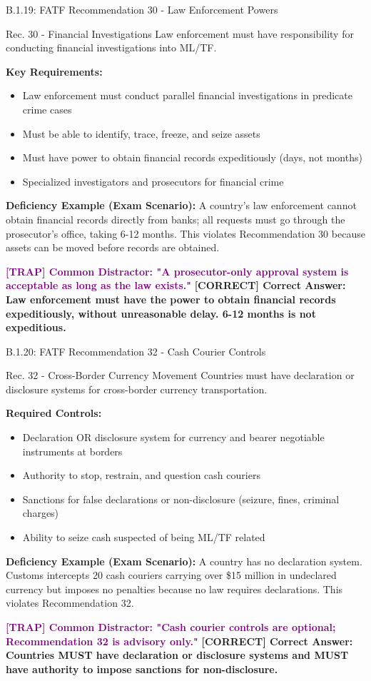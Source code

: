 \documentclass[11pt,a4paper]{beamer}
\newcommand{\trap}[1]{\textcolor{purple}{\textbf{[TRAP] #1}}}
\newcommand{\correct}[1]{\textcolor{green!50!black}{\textbf{[CORRECT] #1}}}
\begin{document}
	\begin{frame}{B.1.19: FATF Recommendation 30 - Law Enforcement Powers}
		\begin{block}{Rec. 30 - Financial Investigations}
			Law enforcement must have responsibility for conducting financial investigations into ML/TF.
		\end{block}
		\textbf{Key Requirements:}
		\begin{itemize}
			\item Law enforcement must conduct parallel financial investigations in predicate crime cases
			\item Must be able to identify, trace, freeze, and seize assets
			\item Must have power to obtain financial records expeditiously (days, not months)
			\item Specialized investigators and prosecutors for financial crime
		\end{itemize}
		\textbf{Deficiency Example (Exam Scenario):}
		A country's law enforcement cannot obtain financial records directly from banks; all requests must go through the prosecutor's office, taking 6-12 months. This violates Recommendation 30 because assets can be moved before records are obtained.
		
		\trap{Common Distractor: "A prosecutor-only approval system is acceptable as long as the law exists."}
		\correct{Correct Answer: Law enforcement must have the power to obtain financial records expeditiously, without unreasonable delay. 6-12 months is not expeditious.}
	\end{frame}
	
	\begin{frame}{B.1.20: FATF Recommendation 32 - Cash Courier Controls}
		\begin{block}{Rec. 32 - Cross-Border Currency Movement}
			Countries must have declaration or disclosure systems for cross-border currency transportation.
		\end{block}
		\textbf{Required Controls:}
		\begin{itemize}
			\item Declaration OR disclosure system for currency and bearer negotiable instruments at borders
			\item Authority to stop, restrain, and question cash couriers
			\item Sanctions for false declarations or non-disclosure (seizure, fines, criminal charges)
			\item Ability to seize cash suspected of being ML/TF related
		\end{itemize}
		\textbf{Deficiency Example (Exam Scenario):}
		A country has no declaration system. Customs intercepts 20 cash couriers carrying over \$15 million in undeclared currency but imposes no penalties because no law requires declarations. This violates Recommendation 32.
		
		\trap{Common Distractor: "Cash courier controls are optional; Recommendation 32 is advisory only."}
		\correct{Correct Answer: Countries MUST have declaration or disclosure systems and MUST have authority to impose sanctions for non-disclosure.}
	\end{frame}
	
\end{document}
